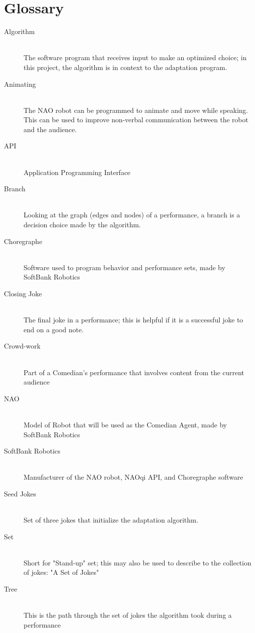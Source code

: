 \documentclass[onecolumn, draftclsnofoot,10pt, compsoc]{IEEEtran}
\begin{document}
\section{Glossary}
\begin{description}
  \item [Algorithm] \hfill \\ The software program that receives input to make an optimized choice; in this project, the algorithm is in context to the adaptation program.
	\item [Animating] \hfill \\ The NAO robot can be programmed to animate and move while speaking. This can be used to improve non-verbal communication between the robot and the audience.
  \item [API] \hfill \\ Application Programming Interface
  \item [Branch] \hfill \\Looking at the graph (edges and nodes) of a performance, a branch is a decision choice made by the algorithm.
  \item [Choregraphe] \hfill \\ Software used to program behavior and performance sets, made by SoftBank Robotics
  \item [Closing Joke] \hfill \\The final joke in a performance; this is helpful if it is a successful joke to end on a good note.
  \item [Crowd-work] \hfill \\ Part of a Comedian's performance that involves content from the current audience
  \item [NAO] \hfill \\ Model of Robot that will be used as the Comedian Agent, made by SoftBank Robotics
  \item [SoftBank Robotics] \hfill \\ Manufacturer of the NAO robot, NAOqi API, and Choregraphe software
  \item [Seed Jokes] \hfill \\ Set of three jokes that initialize the adaptation algorithm.
  \item [Set] \hfill \\Short for "Stand-up" set; this may also be used to describe to the collection of jokes: "A Set of Jokes"
  \item [Tree] \hfill \\This is the path through the set of jokes the algorithm took during a performance

\end{description}



\end{document}
